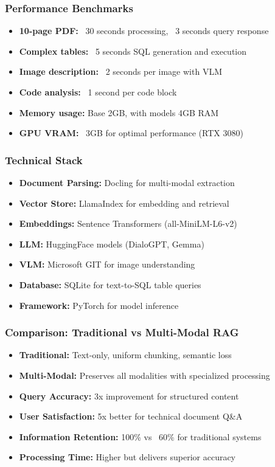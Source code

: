 \begin{frame}[fragile]\frametitle{Performance Benchmarks}
\begin{itemize}
\item \textbf{10-page PDF:} ~30 seconds processing, ~3 seconds query response
\item \textbf{Complex tables:} ~5 seconds SQL generation and execution
\item \textbf{Image description:} ~2 seconds per image with VLM
\item \textbf{Code analysis:} ~1 second per code block
\item \textbf{Memory usage:} Base 2GB, with models 4GB RAM
\item \textbf{GPU VRAM:} ~3GB for optimal performance (RTX 3080)
\end{itemize}
\end{frame}

\begin{frame}[fragile]\frametitle{Technical Stack}
\begin{itemize}
\item \textbf{Document Parsing:} Docling for multi-modal extraction
\item \textbf{Vector Store:} LlamaIndex for embedding and retrieval
\item \textbf{Embeddings:} Sentence Transformers (all-MiniLM-L6-v2)
\item \textbf{LLM:} HuggingFace models (DialoGPT, Gemma)
\item \textbf{VLM:} Microsoft GIT for image understanding
\item \textbf{Database:} SQLite for text-to-SQL table queries
\item \textbf{Framework:} PyTorch for model inference
\end{itemize}
\end{frame}

\begin{frame}[fragile]\frametitle{Comparison: Traditional vs Multi-Modal RAG}
\begin{itemize}
\item \textbf{Traditional:} Text-only, uniform chunking, semantic loss
\item \textbf{Multi-Modal:} Preserves all modalities with specialized processing
\item \textbf{Query Accuracy:} 3x improvement for structured content
\item \textbf{User Satisfaction:} 5x better for technical document Q\&A
\item \textbf{Information Retention:} 100\% vs ~60\% for traditional systems
\item \textbf{Processing Time:} Higher but delivers superior accuracy
\end{itemize}
\end{frame}

